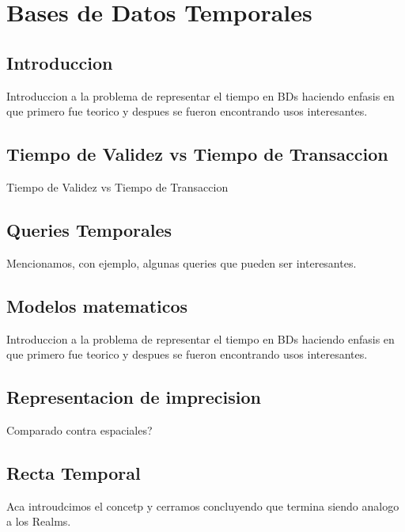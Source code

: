 \chapter{Bases de Datos Temporales}  \label{cap:t}


\section{Introduccion}
\label{sec:t1}
Introduccion a la problema de representar el tiempo en BDs haciendo enfasis en que primero fue teorico y despues se fueron encontrando usos interesantes.

\section{Tiempo de Validez vs Tiempo de Transaccion}
\label{sec:t2}
Tiempo de Validez vs Tiempo de Transaccion

\section{Queries Temporales}
\label{sec:t3}
Mencionamos, con ejemplo, algunas queries que pueden ser interesantes.

\section{Modelos matematicos}
\label{sec:t4}
Introduccion a la problema de representar el tiempo en BDs haciendo enfasis en que primero fue teorico y despues se fueron encontrando usos interesantes.

\section{Representacion de imprecision}
\label{sec:t5}
Comparado contra espaciales?

\section{Recta Temporal}
\label{sec:t6}
Aca introudcimos el concetp y cerramos concluyendo que termina siendo analogo a los Realms.

% 
